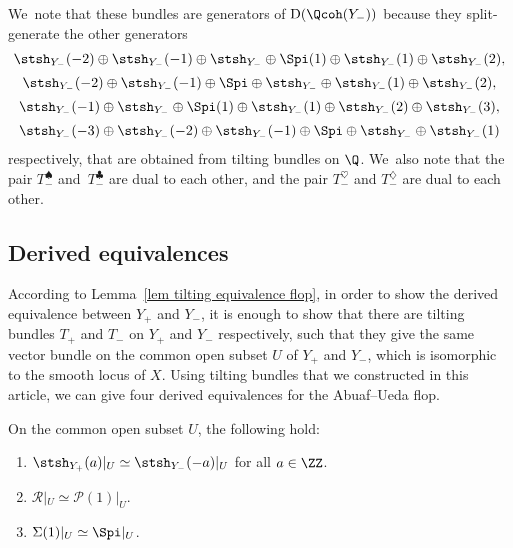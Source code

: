 We~note that these bundles are generators of $\mathrm{D}(\Qcoh(Y_-))$ because they split-generate the other generators
\begin{gather*}
\stsh_{Y_-}(-2) \oplus \stsh_{Y_-}(-1) \oplus \stsh_{Y_-} \oplus \Spi(1) \oplus \stsh_{Y_-}(1) \oplus \stsh_{Y_-}(2), \\[.5ex]
\stsh_{Y_-}(-2) \oplus \stsh_{Y_-}(-1) \oplus \Spi \oplus\stsh_{Y_-} \oplus \stsh_{Y_-}(1) \oplus \stsh_{Y_-}(2), \\[.5ex]
\stsh_{Y_-}(-1) \oplus \stsh_{Y_-} \oplus \Spi(1) \oplus \stsh_{Y_-}(1) \oplus \stsh_{Y_-}(2) \oplus \stsh_{Y_-}(3), \\[.5ex]
\stsh_{Y_-}(-3) \oplus \stsh_{Y_-}(-2) \oplus \stsh_{Y_-}(-1) \oplus \Spi \oplus \stsh_{Y_-} \oplus \stsh_{Y_-}(1)
\end{gather*}
respectively, that are obtained from tilting bundles on $\Q$.
We~also note that the pair $T_-^{\spadesuit}$ and~$T_-^{\clubsuit}$ are dual to each other,
and the pair $T_-^{\heartsuit}$ and $T_-^{\diamondsuit}$ are dual to each other.

\subsection{Derived equivalences}

According to Lemma~\ref{lem tilting equivalence flop},
in order to show the derived equivalence between $Y_+$ and $Y_-$,
it is enough to show that there are tilting bundles $T_+$ and $T_-$ on $Y_+$ and $Y_-$ respectively,
such that they give the same vector bundle on the common open subset $U$ of $Y_+$ and $Y_-$,
which is isomorphic to the smooth locus of $X$.
Using tilting bundles that we constructed in this article, we can give four derived equivalences for the Abuaf--Ueda flop.

\begin{Lemma}
On the common open subset $U$, the following hold:
\begin{enumerate}\itemsep=0pt
\item[$1.$] $\stsh_{Y_+}(a)|_U \simeq \stsh_{Y_-}(-a)|_U$ for all $a \in \ZZ$.
\item[$2.$] $\mathcal{R}|_U \simeq \mathcal{P}(1)|_U$.
\item[$3.$] $\Sigma(1)|_U \simeq \Spi|_U$.
\end{enumerate}
\end{Lemma}

